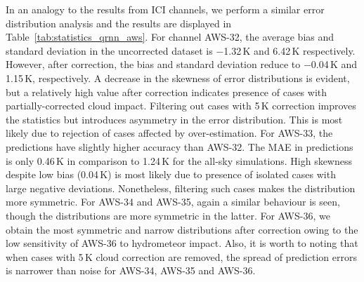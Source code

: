 \documentclass[amt, manuscript]{copernicus}
\begin{document}
In an analogy to the results from ICI channels, we perform a similar error distribution analysis  and the results are displayed in Table~\ref{tab:statistics_qrnn_aws}. For channel AWS-32, the average bias and standard deviation in the uncorrected dataset is $-$1.32\,K and 6.42\,K respectively. However, after correction, the bias and standard deviation reduce to $-$0.04\,K and 1.15\,K, respectively. A decrease in the skewness of error distributions is evident, but a relatively high value after correction indicates presence of cases with partially-corrected cloud impact. Filtering out cases with 5\,K correction improves the statistics but introduces asymmetry in the error distribution. This is most likely due to rejection of cases affected by over-estimation. For AWS-33, the predictions have slightly higher accuracy than AWS-32. The MAE in predictions is only 0.46\,K in comparison to 1.24\,K for the all-sky simulations. High skewness despite low bias (0.04\,K) is most likely due to presence of isolated cases with large negative deviations. Nonetheless, filtering such cases makes the distribution more symmetric. For AWS-34 and AWS-35, again a similar behaviour is seen, though the distributions are more symmetric in the latter. For AWS-36, we obtain the most symmetric and narrow distributions after correction owing to the low sensitivity of AWS-36 to hydrometeor impact.  Also, it is worth to noting that when cases with 5\,K cloud correction are removed, the spread of prediction errors is narrower than noise for AWS-34, AWS-35 and AWS-36. 
\end{document}
